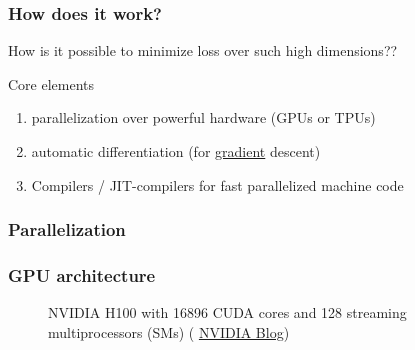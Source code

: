 \begin{frame}
    \frametitle{How does it work?}
    
    How is it possible to minimize loss over such high dimensions??

        \vspace{0.5em}
        \vspace{0.5em}
        \vspace{0.5em}
        \vspace{0.5em}
        \pause

    Core elements
    \begin{enumerate}
        \item parallelization over powerful hardware (GPUs or TPUs)
        \vspace{0.5em}
        \item automatic differentiation (for \underline{gradient} descent)
        \vspace{0.5em}
        \item Compilers / JIT-compilers for fast parallelized machine code
    \end{enumerate}

\end{frame}

\begin{frame}[fragile]
    \frametitle{Parallelization}

    \begin{figure}
       \begin{center}
       \end{center}
    \end{figure}
    
\end{frame}

\begin{frame}[fragile]
    \frametitle{GPU architecture}
    \begin{figure}
        \centering
        \caption{NVIDIA H100 with 16896 CUDA cores and 128 
        streaming multiprocessors (SMs) ({\footnotesize
        \href{
           https://developer.nvidia.com/blog/nvidia-hopper-architecture-in-depth/
           }{NVIDIA Blog}})}
     \end{figure}
\end{frame}

